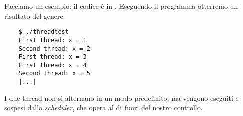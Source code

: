 Facciamo un esempio: il codice è in . Eseguendo il programma otterremo un risultato del genere:
\begin{verbatim}
    $ ./threadtest
    First thread: x = 1
    Second thread: x = 2
    First thread: x = 3
    First thread: x = 4
    Second thread: x = 5
    |...|
\end{verbatim}

I due thread non si alternano in un modo predefinito, ma vengono eseguiti e sospesi dallo \emph{scheduler}, che opera al di fuori del nostro controllo.